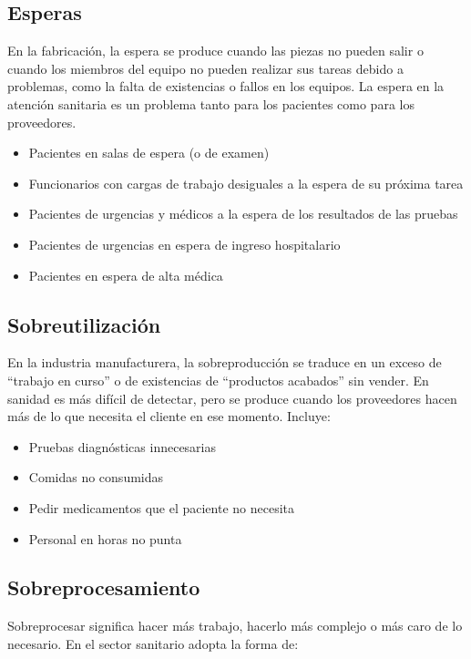 \subsection{Esperas}

En la fabricación, la espera se produce cuando las piezas no pueden salir o cuando los miembros del equipo no pueden realizar sus tareas debido a problemas, como la falta de existencias o fallos en los equipos.
La espera en la atención sanitaria es un problema tanto para los pacientes como para los proveedores.

\begin{itemize}
    \item Pacientes en salas de espera (o de examen)
    \item Funcionarios con cargas de trabajo desiguales a la espera de su próxima tarea
    \item Pacientes de urgencias y médicos a la espera de los resultados de las pruebas
    \item Pacientes de urgencias en espera de ingreso hospitalario
    \item Pacientes en espera de alta médica
\end{itemize}

\subsection{Sobreutilización}

En la industria manufacturera, la sobreproducción se traduce en un exceso de ``trabajo en curso'' o de existencias de ``productos acabados'' sin vender.
En sanidad es más difícil de detectar, pero se produce cuando los proveedores hacen más de lo que necesita el cliente en ese momento.
Incluye:

\begin{itemize}
    \item Pruebas diagnósticas innecesarias
    \item Comidas no consumidas
    \item Pedir medicamentos que el paciente no necesita
    \item Personal en horas no punta
\end{itemize}

\subsection{Sobreprocesamiento}

Sobreprocesar significa hacer más trabajo, hacerlo más complejo o más caro de lo necesario.
En el sector sanitario adopta la forma de:

